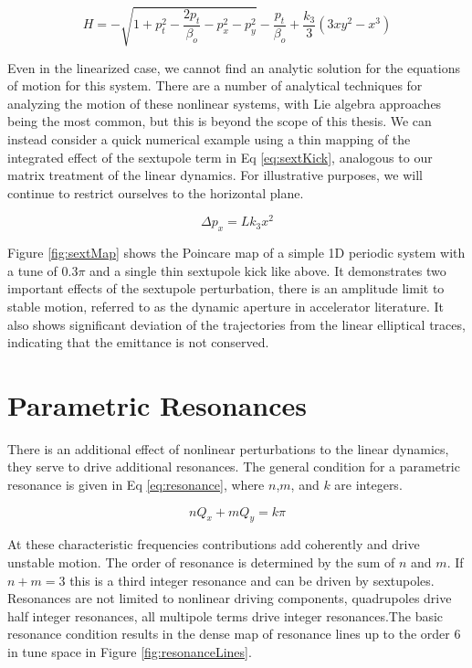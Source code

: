 \begin{equation} \label{eq:H_sext}
	H = -\sqrt{1 + p_t^2 - \frac{2p_t}{\beta_o} - p_x^2 - p_y^2} - \frac{p_t}{\beta_o} + \frac{k_3}{3}(3 x y^2 - x^3)
\end{equation}

Even in the linearized case, we cannot find an analytic solution for the equations of motion for this system. There are a number of analytical techniques for analyzing the motion of these nonlinear systems, with Lie algebra approaches being the most common, but this is beyond the scope of this thesis. We can instead consider a quick numerical example using a thin mapping of the integrated effect of the sextupole term in Eq \ref{eq:sextKick}, analogous to our matrix treatment of the linear dynamics. For illustrative purposes, we will continue to restrict ourselves to the horizontal plane.

\begin{equation} \label{eq:sextKick}
	\Delta p_x = Lk_3x^2
\end{equation}

Figure \ref{fig:sextMap} shows the Poincare map of a simple 1D periodic system with a tune of 0.3$\pi$ and a single thin sextupole kick like above. It demonstrates two important effects of the sextupole perturbation, there is an amplitude limit to stable motion, referred to as the dynamic aperture in accelerator literature. It also shows significant deviation of the trajectories from the linear elliptical traces, indicating that the emittance is not conserved.

\section{Parametric Resonances} \label{sec:resonances}
There is an additional effect of nonlinear perturbations to the linear dynamics, they serve to drive additional resonances. The general condition for a parametric resonance is given in Eq \ref{eq:resonance}, where $n$,$m$, and $k$ are integers.

\begin{equation} \label{eq:resonance}
	nQ_x + mQ_y = k\pi
\end{equation}

At these characteristic frequencies contributions add coherently and drive unstable motion. The order of resonance is determined by the sum of $n$ and $m$. If $n + m = 3$ this is a third integer resonance and can be driven by sextupoles. Resonances are not limited to nonlinear driving components, quadrupoles drive half integer resonances, all multipole terms drive integer resonances.The basic resonance condition results in the dense map of resonance lines up to the order 6 in tune space in Figure \ref{fig:resonanceLines}. 

